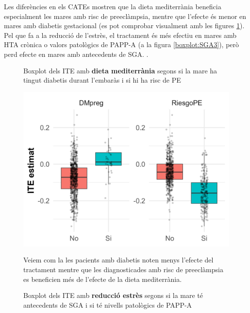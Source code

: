 \documentclass[../main.tex]{subfiles}
\begin{document}
    Les diferències en els CATEs mostren que la dieta mediterrània beneficia especialment les mares amb risc de preeclàmpsia, mentre que l’efecte és menor en mares amb diabetis gestacional (es pot comprobar visualment amb les figures \ref{boxplot:SGA2}). Pel que fa a la reducció de l’estrès, el tractament és més efectiu en mares amb HTA crònica o valors patològics de PAPP-A (a la figura \ref{boxplot:SGA3}), però perd efecte en mares amb antecedents de SGA.
.
    \begin{figure}[!htb]
      \centering
      \begin{minipage}[t]{0.48\textwidth}
        \captionsetup{font=small}
        \caption*{\centering Boxplot dels ITE amb \textbf{dieta mediterrània} segons si la mare ha tingut diabetis durant l'embaràs i si hi ha risc de PE}
        \includegraphics[width=\textwidth]{imgs/boxplots/boxplot_2_SGA.jpg}
        \captionsetup{font=footnotesize}
        \caption{Veiem com la les pacients amb diabetis noten menys l'efecte del tractament mentre que les diagnosticades amb risc de preeclàmpsia es beneficien més de l'efecte de la dieta mediterrània.}
        \label{boxplot:SGA2}
      \end{minipage}
      \hspace{0.01\textwidth}
      \begin{minipage}[t]{0.48\textwidth}
        \captionsetup{font=small}
        \caption*{\centering Boxplot dels ITE amb \textbf{reducció estrès} segons si la mare té antecedents de SGA i si té nivells patològics de PAPP-A}

\end{minipage}
\end{figure}
\end{document}
